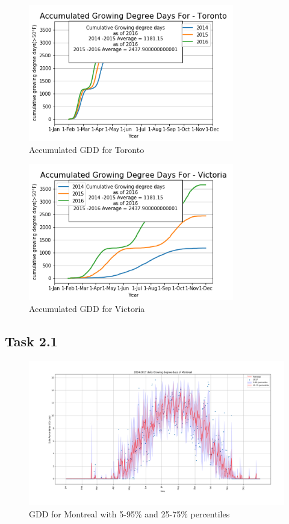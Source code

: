 \documentclass[12pt]{article}
\begin{document}
\begin{figure}[!htbp]
\centering
\includegraphics[width=0.8\textwidth]{./docs/TorontoGDD.png} 
\caption{\scriptsize Accumulated GDD for Toronto}
\label{accuGDD_2}		  
\end{figure}
	
\begin{figure}[!htbp]
\centering
\includegraphics[width=0.8\textwidth]{./docs/VictoriaGDD.png} 
\caption{\scriptsize Accumulated GDD for Victoria}
\label{accuGDD_3}		  
\end{figure}	


\pagebreak

\subsection{Task 2.1}
\begin{figure}[!htbp]
\centering
\includegraphics[width=1.0\textwidth]{./docs/task1.png} 
\caption{\scriptsize GDD for Montreal with 5-95\% and 25-75\% percentiles}
\label{GDDwCI}		  
\end{figure}
\end{document}
